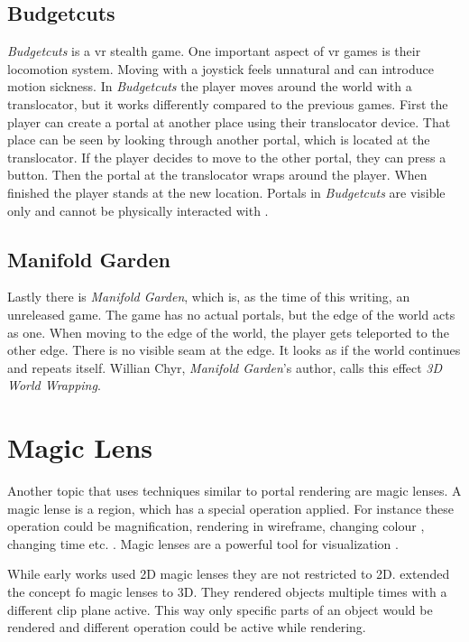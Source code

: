 \subsection{Budgetcuts}
\textit{Budgetcuts} is a \gls{vr} stealth game. One important aspect of \gls{vr} games is their locomotion system. Moving with a joystick feels unnatural and can introduce motion sickness. In \textit{Budgetcuts} the player moves around the world with a translocator, but it works differently compared to the previous games. First the player can create a portal at another place using their translocator device. That place can be seen by looking through another portal, which is located at the translocator. If the player decides to move to the other portal, they can press a button. Then the portal at the translocator wraps around the player. When finished the player stands at the new location. Portals in \textit{Budgetcuts} are visible only and cannot be physically interacted with \cite{budgetcuts, gdc:budgetcuts}.

\subsection{Manifold Garden}
Lastly there is \textit{Manifold Garden}, which is, as the time of this writing, an unreleased game. The game has no actual portals, but the edge of the world acts as one. When moving to the edge of the world, the player gets teleported to the other edge. There is no visible seam at the edge. It looks as if the world continues and repeats itself. Willian Chyr, \textit{Manifold Garden}'s author, calls this effect \textit{3D World Wrapping}.




\section{Magic Lens}
Another topic that uses techniques similar to portal rendering are magic lenses. A magic lense is a region, which has a special operation applied. For instance these operation could be magnification, rendering in wireframe, changing colour \cite{bier:1993:toolglass}, changing time \cite{ryall:2005:temporal, tiesel:2009:composable} etc. . Magic lenses are a powerful tool for visualization  \cite{bier:1993:toolglass, tominski:2014:survey}.

While early works used 2D magic lenses \cite{bier:1993:toolglass} they are not restricted to 2D. \textcite{viega:1996:3d} extended the concept fo magic lenses to 3D. They  rendered objects multiple times with a different clip plane active. This way only specific parts of an object would be rendered and different operation could be active while rendering.


